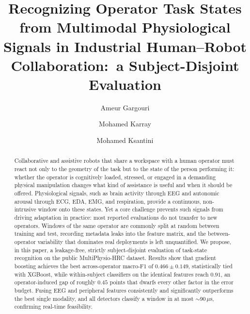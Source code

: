\documentclass{llncs}
\begin{document}
\title{Recognizing Operator Task States from Multimodal Physiological Signals in Industrial Human--Robot Collaboration:\ a Subject-Disjoint Evaluation}

\author{Ameur Gargouri \and Mohamed Karray \and Mohamed Ksantini}

\maketitle

\begin{abstract}
Collaborative and assistive robots that share a workspace with a human operator must react not only to the geometry of the task but to the state of the person performing it: whether the operator is cognitively loaded, stressed, or engaged in a demanding physical manipulation changes what kind of assistance is useful and when it should be offered. Physiological signals, such as brain activity through \ac{EEG} and autonomic arousal through \ac{ECG}, \ac{EDA}, \ac{EMG}, and respiration, provide a continuous, non-intrusive window onto these states. Yet a core challenge prevents such signals from driving adaptation in practice: most reported evaluations do not transfer to new operators. Windows of the same operator are commonly split at random between training and test, recording metadata leaks into the feature matrix, and the between-operator variability that dominates real deployments is left unquantified. We propose, in this paper, a leakage-free, strictly subject-disjoint evaluation of task-state recognition on the public MultiPhysio-\ac{HRC} dataset. Results show that gradient boosting achieves the best across-operator macro-F1 of $0.466\pm0.149$, statistically tied with \ac{XGBoost}, while within-subject classifiers on the identical features reach $0.91$, an operator-induced gap of roughly $0.45$ points that dwarfs every other factor in the error budget. Fusing \ac{EEG} and peripheral features consistently and significantly outperforms the best single modality, and all detectors classify a window in at most $\sim$90\,$\mu$s, confirming real-time feasibility.
\end{abstract}
\end{document}
